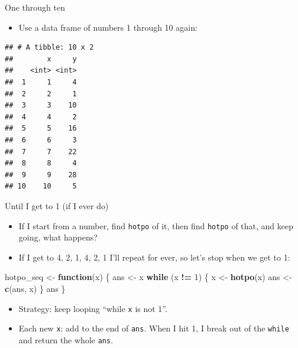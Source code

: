 \documentclass[
  ignorenonframetext,
]{beamer}
\newenvironment{Shaded}{\begin{snugshade}}{\end{snugshade}}
\newcommand{\ControlFlowTok}[1]{\textcolor[rgb]{0.13,0.29,0.53}{\textbf{#1}}}
\newcommand{\DataTypeTok}[1]{\textcolor[rgb]{0.13,0.29,0.53}{#1}}
\newcommand{\DecValTok}[1]{\textcolor[rgb]{0.00,0.00,0.81}{#1}}
\newcommand{\KeywordTok}[1]{\textcolor[rgb]{0.13,0.29,0.53}{\textbf{#1}}}
\newcommand{\NormalTok}[1]{#1}
\newcommand{\OperatorTok}[1]{\textcolor[rgb]{0.81,0.36,0.00}{\textbf{#1}}}
\newcommand{\StringTok}[1]{\textcolor[rgb]{0.31,0.60,0.02}{#1}}
\providecommand{\tightlist}{%
  \setlength{\itemsep}{0pt}\setlength{\parskip}{0pt}}
\begin{document}
\begin{frame}[fragile]{One through ten}
\protect\hypertarget{one-through-ten}{}

\begin{itemize}
\tightlist
\item
  Use a data frame of numbers 1 through 10 again:
\end{itemize}

\begin{Shaded}
\end{Shaded}

\begin{verbatim}
## # A tibble: 10 x 2
##        x     y
##    <int> <int>
##  1     1     4
##  2     2     1
##  3     3    10
##  4     4     2
##  5     5    16
##  6     6     3
##  7     7    22
##  8     8     4
##  9     9    28
## 10    10     5
\end{verbatim}

\end{frame}

\begin{frame}[fragile]{Until I get to 1 (if I ever do)}
\protect\hypertarget{until-i-get-to-1-if-i-ever-do}{}

\begin{itemize}
\tightlist
\item
  If I start from a number, find \texttt{hotpo} of it, then find
  \texttt{hotpo} of that, and keep going, what happens?
\item
  If I get to 4, 2, 1, 4, 2, 1 I'll repeat for ever, so let's stop when
  we get to 1:
\end{itemize}

\begin{Shaded}
\begin{Highlighting}[]
\NormalTok{hotpo_seq <-}\StringTok{ }\ControlFlowTok{function}\NormalTok{(x) \{}
\NormalTok{  ans <-}\StringTok{ }\NormalTok{x}
  \ControlFlowTok{while}\NormalTok{ (x }\OperatorTok{!=}\StringTok{ }\DecValTok{1}\NormalTok{) \{}
\NormalTok{    x <-}\StringTok{ }\KeywordTok{hotpo}\NormalTok{(x)}
\NormalTok{    ans <-}\StringTok{ }\KeywordTok{c}\NormalTok{(ans, x)}
\NormalTok{  \}}
\NormalTok{  ans}
\NormalTok{\}}
\end{Highlighting}
\end{Shaded}

\begin{itemize}
\tightlist
\item
  Strategy: keep looping ``while \texttt{x} is not 1''.
\item
  Each new \texttt{x}: add to the end of \texttt{ans}. When I hit 1, I
  break out of the \texttt{while} and return the whole \texttt{ans}.
\end{itemize}

\end{frame}
\end{document}
